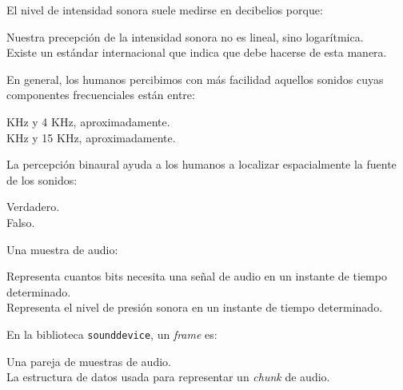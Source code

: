 \documentclass[legalpaper, 12pt, addpoints]{exam}
\begin{document}
\begin{questions}
\vspace{0.10in}

\question El nivel de intensidad sonora suele medirse en decibelios porque:

\begin{oneparchoices}
  \choice Nuestra precepción de la intensidad sonora no es lineal, sino logarítmica.\\
  \choice Existe un estándar internacional que indica que debe hacerse de esta manera.
\end{oneparchoices}

\vspace{0.10in}

\question En general, los humanos percibimos con más facilidad
aquellos sonidos cuyas componentes frecuenciales están entre:

\begin{oneparchoices}
   KHz y 4 KHz, aproximadamente.\\
   KHz y 15 KHz, aproximadamente.
\end{oneparchoices}
  
\vspace{0.10in}

\question La percepción binaural ayuda a los humanos a localizar espacialmente la fuente de los sonidos:

\begin{oneparchoices}
  \choice Verdadero.\\
  \choice Falso.
\end{oneparchoices}
  
\vspace{0.10in}

\question Una muestra de audio:

\begin{oneparchoices}
  \choice Representa cuantos bits necesita una señal de audio en un instante de tiempo determinado.\\
  \choice Representa el nivel de presión sonora en un instante de tiempo determinado.
\end{oneparchoices}
  
\vspace{0.10in}

\question En la biblioteca \texttt{sounddevice}, un \emph{frame} es:

\begin{oneparchoices}
  \choice Una pareja de muestras de audio.\\
  \choice La estructura de datos usada para representar un \emph{chunk} de audio.
\end{oneparchoices}
  

\end{questions}
\end{document}
